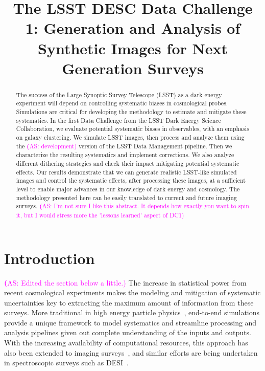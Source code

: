 \documentclass[twocolumn]{aastex62}
\newcommand{\as}[1]{{\textcolor{magenta}{{\textbf (AS: #1)}}}}
\begin{document}
\title[LSST DESC DC1]{The LSST DESC Data Challenge 1: Generation and Analysis of Synthetic Images for Next Generation Surveys }


\begin{abstract}

The success of the Large Synoptic Survey Telescope (LSST) as a dark energy experiment will depend on controlling systematic biases in cosmological probes. Simulations are critical for developing the methodology to estimate and mitigate these systematics. In the first Data Challenge from the LSST Dark Energy Science Collaboration, we evaluate potential systematic biases in observables, with an emphasis on galaxy clustering. We simulate LSST images, then process and analyze them using the \as{development} version of the LSST Data Management pipeline. Then we characterize the resulting systematics and implement corrections. We also analyze different dithering strategies and check their impact mitigating potential systematic effects. Our results demonstrate that we can generate realistic LSST-like simulated images and control the systematic effects, after processing these images, at a sufficient level to enable major advances in our knowledge of dark energy and cosmology. The methodology presented here can be easily translated to current and future imaging surveys.
\as{I'm not sure I like this abstract. It depends how exactly you want to spin it, but I would stress more the 'lessons learned' aspect of DC1}

\end{abstract}


\section{Introduction}
\label{sec:intro}
\as{Edited the section below a little.}
The increase in statistical power from recent cosmological experiments makes the modeling and mitigation of systematic uncertainties key to extracting the maximum amount of information from these surveys. More traditional in high energy particle physics~\citep{Brun:118715, 2006JHEP...05..026S}, end-to-end simulations provide a unique framework to
model systematics and streamline processing and analysis pipelines given out complete understanding of the inputs and outputs. With the increasing availability of computational resources, this approach has also been extended to imaging surveys~\citep{2016ApJ...817...25B}, and similar efforts are being undertaken in spectroscopic surveys such as DESI~\citep{2016arXiv161100036D}.
\end{document}
